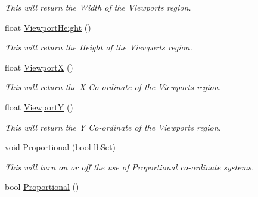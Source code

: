\begin{DoxyCompactItemize}
\begin{DoxyCompactList}\small\item\em This will return the Width of the Viewports region. \end{DoxyCompactList}\item 
\hypertarget{classc_viewport_control_a9f06d752113dd2d8c0b10b109cbe4daf}{
float \hyperlink{classc_viewport_control_a9f06d752113dd2d8c0b10b109cbe4daf}{ViewportHeight} ()}
\label{classc_viewport_control_a9f06d752113dd2d8c0b10b109cbe4daf}

\begin{DoxyCompactList}\small\item\em This will return the Height of the Viewports region. \end{DoxyCompactList}\item 
\hypertarget{classc_viewport_control_af151ca67dbf27868aec9b18c827548c8}{
float \hyperlink{classc_viewport_control_af151ca67dbf27868aec9b18c827548c8}{ViewportX} ()}
\label{classc_viewport_control_af151ca67dbf27868aec9b18c827548c8}

\begin{DoxyCompactList}\small\item\em This will return the X Co-\/ordinate of the Viewports region. \end{DoxyCompactList}\item 
\hypertarget{classc_viewport_control_aad0486f38adb1f1ae5d415c62a9550fc}{
float \hyperlink{classc_viewport_control_aad0486f38adb1f1ae5d415c62a9550fc}{ViewportY} ()}
\label{classc_viewport_control_aad0486f38adb1f1ae5d415c62a9550fc}

\begin{DoxyCompactList}\small\item\em This will return the Y Co-\/ordinate of the Viewports region. \end{DoxyCompactList}\item 
\hypertarget{classc_viewport_control_a56d7ce89ad28c3c47efa12e2460bbe5c}{
void \hyperlink{classc_viewport_control_a56d7ce89ad28c3c47efa12e2460bbe5c}{Proportional} (bool lbSet)}
\label{classc_viewport_control_a56d7ce89ad28c3c47efa12e2460bbe5c}

\begin{DoxyCompactList}\small\item\em This will turn on or off the use of Proportional co-\/ordinate systems. \end{DoxyCompactList}\item 
\hypertarget{classc_viewport_control_ac71e6a04b8ab00c68c527116f923e593}{
bool \hyperlink{classc_viewport_control_ac71e6a04b8ab00c68c527116f923e593}{Proportional} ()}
\label{classc_viewport_control_ac71e6a04b8ab00c68c527116f923e593}


\end{DoxyCompactItemize}
